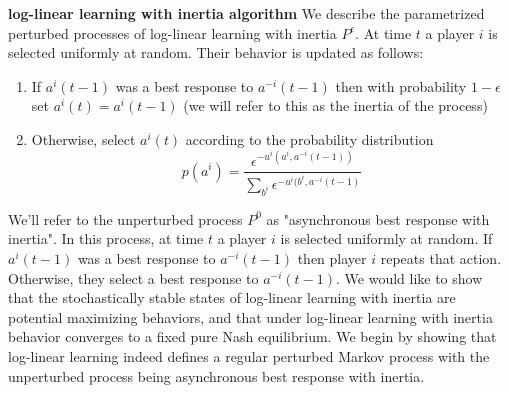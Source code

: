 {\bf log-linear learning with inertia algorithm} We describe the parametrized perturbed processes of log-linear learning with inertia $P^{\epsilon}$. At time $t$ a player $i$ is selected uniformly at random. Their behavior is updated as follows:
\begin{enumerate}
\item If $a^i(t-1)$ was a best response to $a^{-i}(t-1)$ then with probability $1-\epsilon$ set $a^i(t) = a^i(t-1)$ (we will refer to this as the inertia of the process)
\item Otherwise, select $a^i(t)$ according to the probability distribution
$$
p(a^i) = \dfrac{\epsilon^{-u^i(a^i, a^{-i}(t-1))}}{\sum_{b^i} \epsilon^{-u^i(b^i, a^{-i}(t-1)}}
$$
\end{enumerate}

We'll refer to the unperturbed process $P^0$ as "asynchronous best response with inertia". In this process, at time $t$ a player $i$ is selected uniformly at random. If $a^i(t-1)$ was a best response to $a^{-i}(t-1)$ then player $i$ repeats that action. Otherwise, they select a best response to $a^{-i}(t-1)$. We would like to show that the stochastically stable states of log-linear learning with inertia are potential maximizing behaviors, and that under log-linear learning with inertia behavior converges to a fixed pure Nash equilibrium. We begin by showing that log-linear learning indeed defines a regular perturbed Markov process with the unperturbed process being asynchronous best response with inertia.

